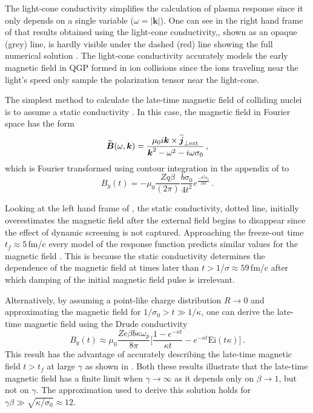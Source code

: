 The light-cone conductivity  simplifies the calculation of plasma response since it only depends on a single variable ($\omega = |\boldsymbol{k}|$). One can see in the right hand frame of  that results obtained using the light-cone conductivity,, shown as an opaque (grey) line, is hardly visible under the  dashed (red) line showing the full numerical solution . The light-cone conductivity accurately models the early magnetic field in QGP formed in ion collisions since the ions traveling near the light's speed only sample the polarization tensor near the light-cone. 

The simplest method to calculate the late-time magnetic field of colliding nuclei is to assume a static conductivity \cite{Tuchin:2013apa}. In this case, the magnetic field in Fourier space has the form
\begin{equation}\label{eq:bstat}
    \widetilde{\boldsymbol{B}}(\omega,\boldsymbol{k}) = \frac{ \mu_0 i\boldsymbol{k} \times \widetilde{\boldsymbol{j}}_{\perp \text{ext}}}{\boldsymbol{k}^2 - \omega^2 - i\omega\sigma_0}\,,
\end{equation}
which is Fourier transformed using contour integration in the appendix of \cite{Grayson:2022asf} to
\begin{equation}\label{eq:banalyticapp}
   B_y(t) = -\mu_0 \frac{ Zq \beta }{(2\pi)} \frac{ b\sigma_0}{4t^2} e^{\frac{-b^2 \sigma_0}{16 t}}\,.
\end{equation}

Looking at the left hand frame of , the static conductivity, dotted line, initially overestimates the magnetic field after the external field begins to disappear since the effect of dynamic screening is not captured. Approaching the freeze-out time $t_f \approx 5\,$fm/c every model of the response function predicts similar values for the magnetic field \cite{Song:2007ux}. This is because the static conductivity determines the dependence of the magnetic field at times later than $t>1/\sigma \approx 59$\,fm/c after which damping of the initial magnetic field pulse is irrelevant. 

Alternatively, by assuming a point-like charge distribution $R\rightarrow 0$ and approximating the magnetic field for $ 1/\sigma_0 > t\gg 1/\kappa$, one can derive the late-time magnetic field using the Drude conductivity 
\begin{equation}\label{eq:latetimeB}
   B_y(t) \approx  \mu_0 \frac{ Ze \beta b \kappa \omega_p }{8\pi}\bigg[ \frac{1- e^{-\kappa t}}{\kappa t} - e^{-\kappa t} \text{Ei}\left(t\kappa\right)\bigg]\,.
\end{equation}
This result has the advantage of accurately describing the late-time magnetic field $t>t_f$  at large $\gamma$ as shown in . Both these results illustrate that the late-time magnetic field has a finite limit when $\gamma\rightarrow\infty$ as it depends only on $\beta\to 1$, but not on $\gamma$. The approximation used to derive this solution holds for $\gamma\beta \gg \sqrt{ \kappa/\sigma_0} \approx 12$. 

